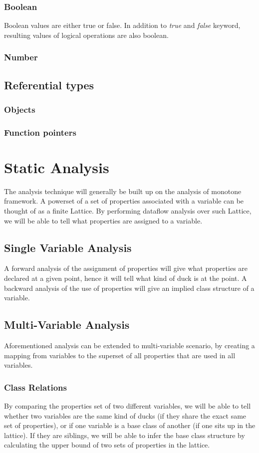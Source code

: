 \documentclass[a4paper,12pt]{article}
\begin{document}
\subsubsection{Boolean}
Boolean values are either true or false. In addition to \textit{true} and \textit{false} keyword, resulting values of logical operations are also boolean.
\subsubsection{Number}
\subsection{Referential types}
\subsubsection{Objects}
\subsubsection{Function pointers}
\section{Static Analysis}
The analysis technique will generally be built up on the analysis of monotone framework. A powerset of a set of properties associated with a variable can be thought of as a finite Lattice. By performing dataflow analysis over such Lattice, we will be able to tell what properties are assigned to a variable.\\
\subsection{Single Variable Analysis}
A forward analysis of the assignment of properties will give what properties are declared at a given point, hence it will tell what kind of duck is at the point. A backward analysis of the use of properties will give an implied class structure of a variable.\\
\subsection{Multi-Variable Analysis}
Aforementioned analysis can be extended to multi-variable scenario, by creating a mapping from variables to the superset of all properties that are used in all variables.
\subsubsection{Class Relations}
By comparing the properties set of two different variables, we will be able to tell whether two variables are the same kind of ducks (if they share the exact same set of properties), or if one variable is a base class of another (if one sits up in the lattice). If they are siblings, we will be able to infer the base class structure by calculating the upper bound of two sets of properties in the lattice.
\end{document}
